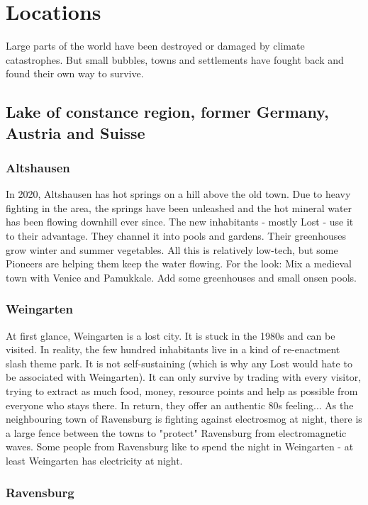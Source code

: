\chapter{Locations}

Large parts of the world have been destroyed or damaged by climate catastrophes. But small bubbles, towns and settlements have fought back and found their own way to survive.

\section{Lake of constance region, former Germany, Austria and Suisse}

\subsection{Altshausen}

In 2020, Altshausen has hot springs on a hill above the old town. Due to heavy fighting in the area, the springs have been unleashed and the hot mineral water has been flowing downhill ever since. The new inhabitants - mostly Lost - use it to their advantage.
They channel it into pools and gardens. Their greenhouses grow winter and summer vegetables.
All this is relatively low-tech, but some Pioneers are helping them keep the water flowing. For the look: Mix a medieval town with Venice and Pamukkale. Add some greenhouses and small onsen pools.


\subsection{Weingarten}

At first glance, Weingarten is a lost city. It is stuck in the 1980s and can be visited. In reality, the few hundred inhabitants live in a kind of re-enactment slash theme park. It is not self-sustaining (which is why any Lost would hate to be associated with Weingarten).
It can only survive by trading with every visitor, trying to extract as much food, money, resource points and help as possible from everyone who stays there. In return, they offer an authentic 80s feeling...
As the neighbouring town of Ravensburg is fighting against electrosmog at night, there is a large fence between the towns to "protect" Ravensburg from electromagnetic waves.
Some people from Ravensburg like to spend the night in Weingarten - at least Weingarten has electricity at night.


\subsection{Ravensburg}

